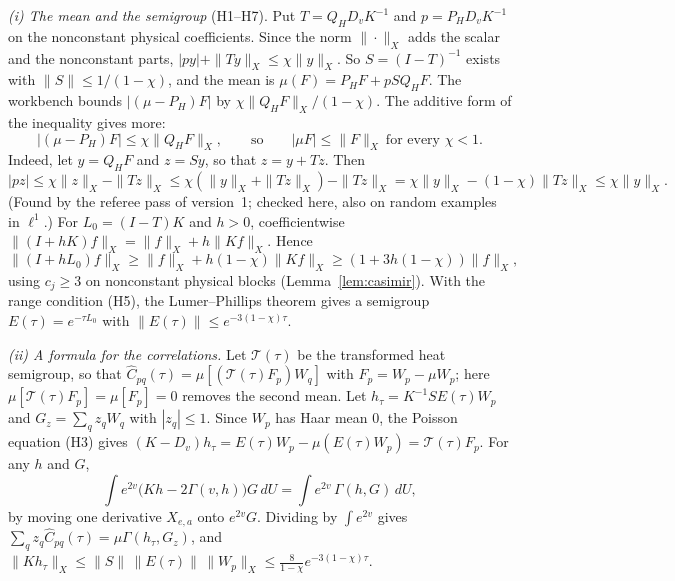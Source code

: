 \emph{(i) The mean and the semigroup} (H1--H7). Put $T=Q_HD_vK^{-1}$ and $p=P_HD_vK^{-1}$ on the nonconstant physical coefficients. Since the norm $\|\cdot\|_X$ adds the scalar and the nonconstant parts, $|py|+\|Ty\|_X\le\chi\|y\|_X$. So $S=(I-T)^{-1}$ exists with $\|S\|\le1/(1-\chi)$, and the mean is $\mu(F)=P_HF+pSQ_HF$. The workbench bounds $|(\mu-P_H)F|$ by $\chi\|Q_HF\|_X/(1-\chi)$. The additive form of the inequality gives more:
\[
|(\mu-P_H)F|\le\chi\|Q_HF\|_X,\qquad\text{so}\qquad|\mu F|\le\|F\|_X\ \text{for every }\chi<1.
\]
Indeed, let $y=Q_HF$ and $z=Sy$, so that $z=y+Tz$. Then
\[
|pz|\le\chi\|z\|_X-\|Tz\|_X\le\chi(\|y\|_X+\|Tz\|_X)-\|Tz\|_X=\chi\|y\|_X-(1-\chi)\|Tz\|_X\le\chi\|y\|_X .
\]
(Found by the referee pass of version~1; checked here, also on random examples in $\ell^1$.)
For $L_0=(I-T)K$ and $h>0$, coefficientwise $\|(I+hK)f\|_X=\|f\|_X+h\|Kf\|_X$. Hence
\[
\|(I+hL_0)f\|_X\ge\|f\|_X+h(1-\chi)\|Kf\|_X\ge(1+3h(1-\chi))\|f\|_X,
\]
using $c_j\ge3$ on nonconstant physical blocks (Lemma~\ref{lem:casimir}). With the range condition (H5), the Lumer--Phillips theorem \cite{LumerPhillips} gives a semigroup $E(\tau)=e^{-\tau L_0}$ with $\|E(\tau)\|\le e^{-3(1-\chi)\tau}$.

\emph{(ii) A formula for the correlations.} Let $\mathcal T(\tau)$ be the transformed heat semigroup, so that $\widehat C_{pq}(\tau)=\mu[(\mathcal T(\tau)F_p)W_q]$ with $F_p=W_p-\mu W_p$; here $\mu[\mathcal T(\tau)F_p]=\mu[F_p]=0$ removes the second mean. Let $h_\tau=K^{-1}SE(\tau)W_p$ and $G_z=\sum_qz_qW_q$ with $|z_q|\le1$. Since $W_p$ has Haar mean $0$, the Poisson equation (H3) gives $(K-D_v)h_\tau=E(\tau)W_p-\mu(E(\tau)W_p)=\mathcal T(\tau)F_p$. For any $h$ and $G$,
\[
\int e^{2v}\bigl(Kh-2\Gamma(v,h)\bigr)G\,dU=\int e^{2v}\,\Gamma(h,G)\,dU,
\]
by moving one derivative $X_{e,a}$ onto $e^{2v}G$. Dividing by $\int e^{2v}$ gives $\sum_qz_q\widehat C_{pq}(\tau)=\mu\Gamma(h_\tau,G_z)$, and $\|Kh_\tau\|_X\le\|S\|\,\|E(\tau)\|\,\|W_p\|_X\le\frac8{1-\chi}e^{-3(1-\chi)\tau}$.

